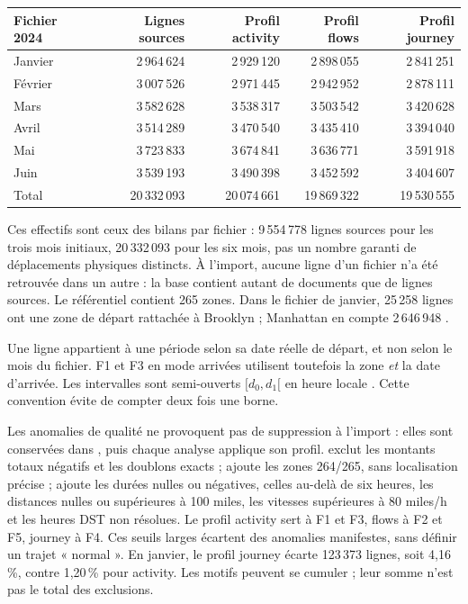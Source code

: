 \begin{center}\small
\begin{tabular}{lrrrr}
\toprule
Fichier 2024 & Lignes sources & Profil activity & Profil flows & Profil journey\\
\midrule
Janvier & 2\,964\,624 & 2\,929\,120 & 2\,898\,055 & 2\,841\,251\\
Février & 3\,007\,526 & 2\,971\,445 & 2\,942\,952 & 2\,878\,111\\
Mars & 3\,582\,628 & 3\,538\,317 & 3\,503\,542 & 3\,420\,628\\
Avril & 3\,514\,289 & 3\,470\,540 & 3\,435\,410 & 3\,394\,040\\
Mai & 3\,723\,833 & 3\,674\,841 & 3\,636\,771 & 3\,591\,918\\
Juin & 3\,539\,193 & 3\,490\,398 & 3\,452\,592 & 3\,404\,607\\
\midrule
Total & 20\,332\,093 & 20\,074\,661 & 19\,869\,322 & 19\,530\,555\\
\bottomrule
\end{tabular}
\end{center}
Ces effectifs sont ceux des bilans par fichier : 9\,554\,778 lignes sources pour les
trois mois initiaux, 20\,332\,093 pour les six mois, pas un nombre garanti de
déplacements physiques distincts. À l'import, aucune ligne d'un fichier n'a été
retrouvée dans un autre : la base contient autant de documents que de lignes
sources. Le référentiel contient 265 zones. Dans le fichier de janvier,
25\,258 lignes ont une zone de départ rattachée à Brooklyn ; Manhattan en compte
2\,646\,948 \cite{preuves}.

Une ligne appartient à une période selon sa date réelle de départ, et non selon
le mois du fichier. F1 et F3 en mode arrivées utilisent toutefois la zone \emph{et}
la date d'arrivée. Les intervalles sont semi-ouverts $[d_0,d_1[$ en heure locale
. Cette convention évite de compter deux fois une borne.

Les anomalies de qualité ne provoquent pas de suppression à l'import : elles sont conservées dans
, puis chaque analyse applique son profil.
 exclut les montants totaux négatifs et les doublons exacts ;
 ajoute les zones 264/265, sans localisation précise ;
 ajoute les durées nulles ou négatives, celles au-delà de six heures,
les distances nulles ou supérieures à 100 miles, les vitesses supérieures à
80 miles/h et les heures DST non résolues. Le profil activity sert à F1 et F3, flows à F2 et F5, journey à F4. Ces seuils larges écartent des anomalies
manifestes, sans définir un trajet « normal ». En janvier, le profil journey
écarte 123\,373 lignes, soit 4,16\,\%, contre 1,20\,\% pour activity.
Les motifs peuvent se cumuler ; leur somme n'est pas le total des exclusions.

